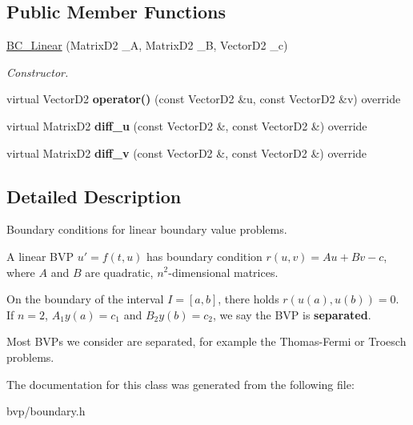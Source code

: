 \subsection*{Public Member Functions}
\begin{DoxyCompactItemize}
\item 
\mbox{\label{classBC__Linear_aaf6acbb563402c281a76c7809c5a9a8e}} 
\hyperlink{classBC__Linear_aaf6acbb563402c281a76c7809c5a9a8e}{B\+C\+\_\+\+Linear} (Matrix\+D2 \+\_\+A, Matrix\+D2 \+\_\+B, Vector\+D2 \+\_\+c)
\begin{DoxyCompactList}\small\item\em Constructor. \end{DoxyCompactList}\item 
\mbox{\label{classBC__Linear_a025c57de07ed39bafb89c55733b64642}} 
virtual Vector\+D2 {\bfseries operator()} (const Vector\+D2 \&u, const Vector\+D2 \&v) override
\item 
\mbox{\label{classBC__Linear_a45d6876383349739f7751f1f8d77603a}} 
virtual Matrix\+D2 {\bfseries diff\+\_\+u} (const Vector\+D2 \&, const Vector\+D2 \&) override
\item 
\mbox{\label{classBC__Linear_a2f2ac8714334063e99ab33a1790a593a}} 
virtual Matrix\+D2 {\bfseries diff\+\_\+v} (const Vector\+D2 \&, const Vector\+D2 \&) override
\end{DoxyCompactItemize}


\subsection{Detailed Description}
Boundary conditions for linear boundary value problems. 

A linear B\+VP $u' = f(t, u)$ has boundary condition $r(u,v) = Au + Bv - c$, where $A$ and $B$ are quadratic, $n^2$-\/dimensional matrices.

On the boundary of the interval $I = [a,b]$, there holds $r(u(a), u(b)) = 0$. If $n = 2$, $A_{1}y(a) = c_1$ and $B_{2}y(b) = c_2$, we say the B\+VP is {\bfseries separated}.

Most B\+V\+Ps we consider are separated, for example the Thomas-\/\+Fermi or Troesch problems. 

The documentation for this class was generated from the following file\+:\begin{DoxyCompactItemize}
\item 
bvp/boundary.\+h\end{DoxyCompactItemize}
